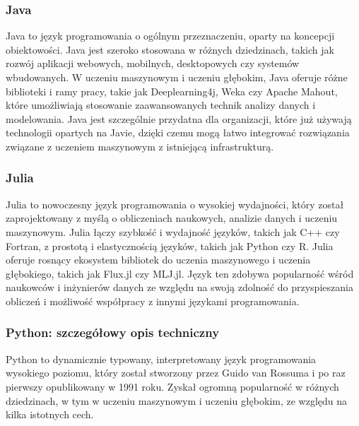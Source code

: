 \subsubsection{Java}
Java to język programowania o ogólnym przeznaczeniu, oparty na koncepcji obiektowości. Java jest szeroko stosowana w różnych dziedzinach, takich jak rozwój aplikacji webowych, mobilnych, desktopowych czy systemów wbudowanych. W uczeniu maszynowym i uczeniu głębokim, Java oferuje różne biblioteki i ramy pracy, takie jak Deeplearning4j, Weka czy Apache Mahout, które umożliwiają stosowanie zaawansowanych technik analizy danych i modelowania. Java jest szczególnie przydatna dla organizacji, które już używają technologii opartych na Javie, dzięki czemu mogą łatwo integrować rozwiązania związane z uczeniem maszynowym z istniejącą infrastrukturą.

\subsubsection{Julia}
Julia to nowoczesny język programowania o wysokiej wydajności, który został zaprojektowany z myślą o obliczeniach naukowych, analizie danych i uczeniu maszynowym. Julia łączy szybkość i wydajność języków, takich jak C++ czy Fortran, z prostotą i elastycznością języków, takich jak Python czy R. Julia oferuje rosnący ekosystem bibliotek do uczenia maszynowego i uczenia głębokiego, takich jak Flux.jl czy MLJ.jl. Język ten zdobywa popularność wśród naukowców i inżynierów danych ze względu na swoją zdolność do przyspieszania obliczeń i możliwość współpracy z innymi językami programowania.

\subsubsection{Python: szczegółowy opis techniczny}
Python to dynamicznie typowany, interpretowany język programowania wysokiego poziomu, który został stworzony przez Guido van Rossuma i po raz pierwszy opublikowany w 1991 roku. Zyskał ogromną popularność w różnych dziedzinach, w tym w uczeniu maszynowym i uczeniu głębokim, ze względu na kilka istotnych cech.

